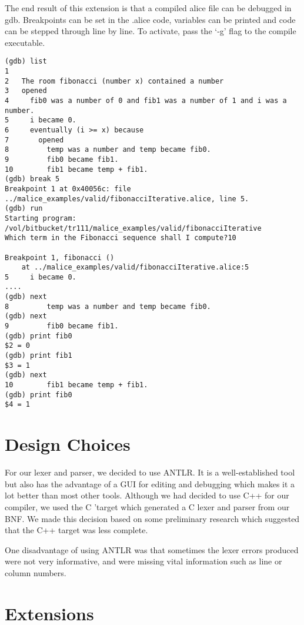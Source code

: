 \documentclass[a4wide, 11pt]{article}
\begin{document}
The end result of this extension is that a compiled alice file can be debugged in gdb. Breakpoints can be set in the .alice code, variables can be printed and code can be stepped through line by line. To activate, pass the `-g' flag to the compile executable.

\begin{verbatim}
(gdb) list
1   
2   The room fibonacci (number x) contained a number
3   opened
4     fib0 was a number of 0 and fib1 was a number of 1 and i was a number.
5     i became 0.
6     eventually (i >= x) because
7       opened
8         temp was a number and temp became fib0.
9         fib0 became fib1.
10        fib1 became temp + fib1.
(gdb) break 5
Breakpoint 1 at 0x40056c: file ../malice_examples/valid/fibonacciIterative.alice, line 5.
(gdb) run
Starting program: /vol/bitbucket/tr111/malice_examples/valid/fibonacciIterative 
Which term in the Fibonacci sequence shall I compute?10

Breakpoint 1, fibonacci ()
    at ../malice_examples/valid/fibonacciIterative.alice:5
5     i became 0.
....
(gdb) next
8         temp was a number and temp became fib0.
(gdb) next
9         fib0 became fib1.
(gdb) print fib0
$2 = 0
(gdb) print fib1
$3 = 1
(gdb) next
10        fib1 became temp + fib1.
(gdb) print fib0
$4 = 1
\end{verbatim}


\section{Design Choices}

For our lexer and parser, we decided to use ANTLR. It is a well-established tool but also has the advantage of a GUI for editing and debugging which makes it a lot better than most other tools. Although we had decided to use C++ for our compiler, we used the C 'target which generated a C lexer and parser from our BNF. We made this decision based on some preliminary research which suggested that the C++ target was less complete.

One disadvantage of using ANTLR was that sometimes the lexer errors produced were not very informative, and were missing vital information such as line or column numbers.

\section{Extensions}
\end{document}
